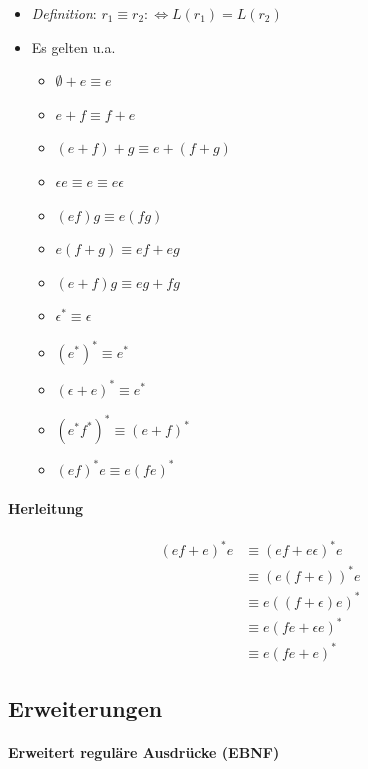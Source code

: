 \documentclass{scrartcl}
\begin{document}
\begin{itemize}
	\item \textit{Definition}: $r_1 \equiv r_2 :\iff L(r_1) = L(r_2)$
	\item Es gelten u.a.
	\begin{itemize}
		\item $\emptyset + e \equiv e$
		\item $e + f \equiv f + e$
		\item $(e + f) + g \equiv e + (f + g)$
		\item $\epsilon e \equiv e \equiv e \epsilon$
		\item $(ef) g \equiv e (fg)$
		\item $e(f + g) \equiv ef + eg$
		\item $(e + f)g \equiv eg + fg$
		\item $\epsilon^* \equiv \epsilon$
		\item $(e^*)^* \equiv e^*$
		\item $(\epsilon + e)^* \equiv e^*$
		\item $(e^*f^*)^* \equiv (e + f)^*$
		\item $(ef)^*e \equiv e(fe)^*$
	\end{itemize}
\end{itemize}

\paragraph{Herleitung}

\begin{align*}
	(ef + e)^* e &\equiv (ef + e \epsilon)^* e \\
	&\equiv (e(f + \epsilon))^* e \\
	&\equiv e((f + \epsilon)e)^* \\
	&\equiv e(fe + \epsilon e)^* \\
	&\equiv e(fe + e)^*
\end{align*}

\subsection{Erweiterungen}

\paragraph{Erweitert reguläre Ausdrücke (EBNF)}
\end{document}
